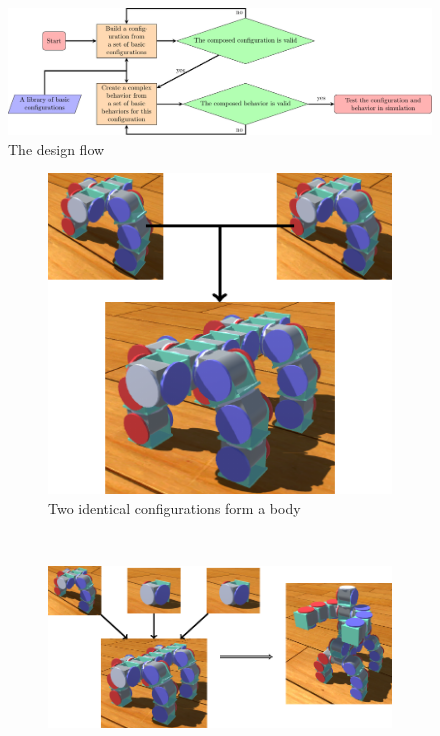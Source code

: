 \documentclass[graybox]{svmult}
\begin{document}
\begin{figure}
\begin{center}
\includegraphics[width=\columnwidth]{images/tikz/design_diagram_hori.pdf}
\caption{The design flow}
\label{fig:design}
\end{center}
\end{figure}

\begin{figure}
\begin{center}
        \begin{subfigure}[b]{0.3\columnwidth}
                \includegraphics[width=\textwidth]{images/tikz/walkbot.pdf}
                \caption{Two identical configurations form a body}
                \label{fig:walkbot1}
        \end{subfigure}
        ~
        \begin{subfigure}[b]{0.65\columnwidth}
                \includegraphics[width=\textwidth]{images/tikz/walkbot2.pdf}

\end{subfigure}
\end{center}
\end{figure}
\end{document}
